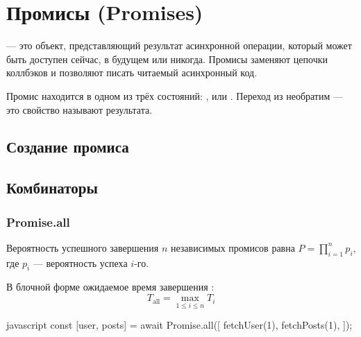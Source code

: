 \section{Промисы (Promises)}

 — это объект, представляющий результат асинхронной
операции, который может быть доступен сейчас, в будущем или никогда.
Промисы заменяют цепочки коллбэков и позволяют писать читаемый
асинхронный код.

Промис находится в одном из трёх состояний: ,
 или .  Переход из 
необратим — это свойство называют 
результата.

\subsection{Создание промиса}


\subsection{Комбинаторы}

\subsubsection{Promise.all}

Вероятность успешного завершения $n$ независимых промисов
равна $P = \prod_{i=1}^{n} p_i$, где $p_i$ — вероятность успеха $i$-го.

В блочной форме ожидаемое время завершения :
\begin{equation}
  T_{\text{all}} = \max_{1 \le i \le n} T_i
\end{equation}

\begin{code}{javascript}
const [user, posts] = await Promise.all([
  fetchUser(1),
  fetchPosts(1),
]);
\end{code}


